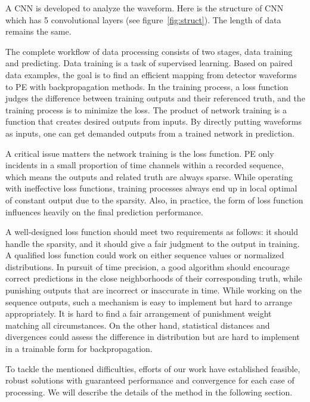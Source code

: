 A CNN is developed to analyze the waveform. Here is the structure of CNN which has 5 convolutional layers (see figure~\ref{fig:struct}). The length of data remains the same. 


The complete workflow of data processing consists of two stages, data training and predicting. Data training is a task of supervised learning.  Based on paired data examples, the goal is to find an efficient mapping from detector waveforms to PE with backpropagation methods. In the training process, a loss function judges the difference between training outputs and their referenced truth, and the training process is to minimize the loss. The product of network training is a function that creates desired outputs from inputs. By directly putting waveforms as inputs, one can get demanded outputs from a trained network in prediction.


A critical issue matters the network training is the loss function. PE only incidents in a small proportion of time channels within a recorded sequence, which means the outputs and related truth are always sparse. While operating with ineffective loss functions, training processes always end up in local optimal of constant output due to the sparsity. Also, in practice, the form of loss function influences heavily on the final prediction performance. 

A well-designed loss function should meet two requirements as follows: it should handle the sparsity, and it should give a fair judgment to the output in training. A qualified loss function could work on either sequence values or normalized distributions. In pursuit of time precision, a good algorithm should encourage correct predictions in the close neighborhoods of their corresponding truth, while punishing outputs that are incorrect or inaccurate in time. While working on the sequence outputs, such a mechanism is easy to implement but hard to arrange appropriately. It is hard to find a fair arrangement of punishment weight matching all circumstances. On the other hand, statistical distances and divergences could assess the difference in distribution but are hard to implement in a trainable form for backpropagation. 

To tackle the mentioned difficulties, efforts of our work have established feasible, robust solutions with guaranteed performance and convergence for each case of processing. We will describe the details of the method in the following section.

